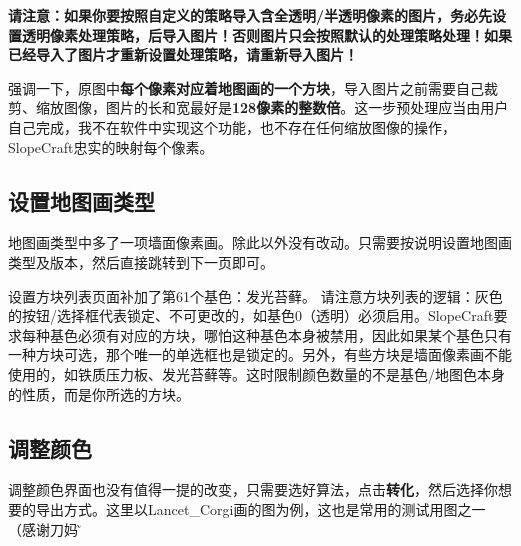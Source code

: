 \documentclass[UTF8]{ctexart}
\begin{document}
    \textbf{请注意：如果你要按照自定义的策略导入含全透明/半透明像素的图片，务必先设置透明像素处理策略，后导入图片！否则图片只会按照默认的处理策略处理！如果已经导入了图片才重新设置处理策略，请重新导入图片！}

    强调一下，原图中\textbf{每个像素对应着地图画的一个方块}，导入图片之前需要自己裁剪、缩放图像，图片的长和宽最好是\textbf{128像素的整数倍}。这一步预处理应当由用户自己完成，我不在软件中实现这个功能，也不存在任何缩放图像的操作，SlopeCraft忠实的映射每个像素。

    \subsection{设置地图画类型}
    地图画类型中多了一项墙面像素画。除此以外没有改动。只需要按说明设置地图画类型及版本，然后直接跳转到下一页即可。

    设置方块列表页面补加了第61个基色：发光苔藓。
    请注意方块列表的逻辑：灰色的按钮/选择框代表锁定、不可更改的，如基色0（透明）必须启用。SlopeCraft要求每种基色必须有对应的方块，哪怕这种基色本身被禁用，因此如果某个基色只有一种方块可选，那个唯一的单选框也是锁定的。另外，有些方块是墙面像素画不能使用的，如铁质压力板、发光苔藓等。这时限制颜色数量的不是基色/地图色本身的性质，而是你所选的方块。

    \subsection{调整颜色}
    调整颜色界面也没有值得一提的改变，只需要选好算法，点击\textbf{转化}，然后选择你想要的导出方式。这里以Lancet\_Corgi画的图为例，这也是常用的测试用图之一（感谢刀妈\~）
    
\end{document}
